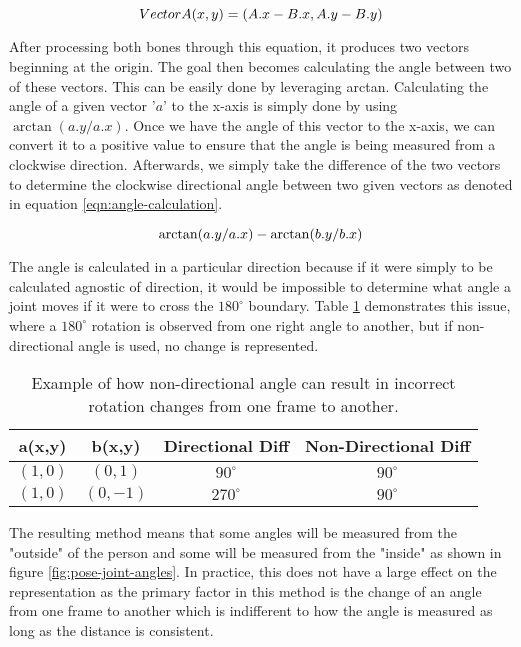 \begin{equation}
	\label{eqn:angle-centering}
	\centering
	VectorA(x,y) = (A.x - B.x, A.y - B.y)
\end{equation}

After processing both bones through this equation, it produces two vectors beginning at the origin. The goal then becomes calculating the angle between two of these vectors. This can be easily done by leveraging arctan. Calculating the angle of a given vector '$a$' to the x-axis is simply done by using $\arctan(a.y/a.x)$. Once we have the angle of this vector to the x-axis, we can convert it to a positive value to ensure that the angle is being measured from a clockwise direction. Afterwards, we simply take the difference of the two vectors to determine the clockwise directional angle between two given vectors as denoted in equation \ref{eqn:angle-calculation}.

\begin{equation}
	\label{eqn:angle-calculation}
	\centering
	\arctan(a.y/a.x) - \arctan(b.y/b.x)
\end{equation}

The angle is calculated in a particular direction because if it were simply to be calculated agnostic of direction, it would be impossible to determine what angle a joint moves if it were to cross the $180^\circ$ boundary. Table \ref{tab:directed-angle-example} demonstrates this issue, where a $180^\circ$ rotation is observed from one right angle to another, but if non-directional angle is used, no change is represented.

\begin{table}[h]
	\centering
	\begin{tabular}{||c c c c||} 
		\hline
		\textbf{a(x,y)} & \textbf{b(x,y)} & \textbf{Directional Diff} & \textbf{Non-Directional Diff} \\ [0.5ex] 
		\hline\hline
		$(1,0)$ & $(0,1)$ & $90^\circ$ & $90^\circ$ \\
		\hline
		$(1,0)$ & $(0,-1)$ & $270^\circ$ & $90^\circ$ \\
		\hline
	\end{tabular}
	\label{tab:directed-angle-example}
	\caption{Example of how non-directional angle can result in incorrect rotation changes from one frame to another.}
\end{table}

The resulting method means that some angles will be measured from the "outside" of the person and some will be measured from the "inside" as shown in figure \ref{fig:pose-joint-angles}. In practice, this does not have a large effect on the representation as the primary factor in this method is the change of an angle from one frame to another which is indifferent to how the angle is measured as long as the distance is consistent.

